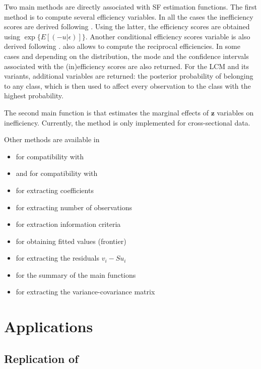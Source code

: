 \documentclass[nojss]{jss}
\begin{document}
Two main methods are directly associated with SF estimation functions. The first
method is  to compute several efficiency variables. In all 
the cases the inefficiency scores are derived following \cite{jon82}. Using
the latter, the efficiency scores are obtained using 
$\exp{\{E\left[\left(-u|\epsilon\right)\right]\}}$. Another conditional efficiency
scores variable is also derived following \cite{batt95}.  also allows
to compute the reciprocal efficiencies. In some cases and depending on the 
distribution, the mode and the confidence intervals associated with the 
(in)efficiency scores are also returned. For the LCM and its variants, additional 
variables are returned: the posterior probability of belonging to any class, 
which is then used to affect every observation to the class with the highest 
probability.

The second main function is  that estimates the marginal effects
of $\mathbf{z}$ variables on inefficiency. Currently, the 
method is only implemented for cross-sectional data.

Other methods are available in 
%
\begin{itemize}
\item {} for compatibility with 
\item {} and  for compatibility with 
\item {} for extracting coefficients
\item {} for extracting number of observations
\item {} for extraction information criteria
\item {} for obtaining fitted values (frontier)
\item {} for extracting the residuals $v_i -Su_i$
\item {} for the summary of the main functions
\item {} for extracting the variance-covariance matrix
\end{itemize}
%

\section{Applications} \label{sec:illus}

\subsection[Replication of Kumbhakar et al.2014, p. 119]{Replication of~\citet[p.~119]{kum14}}
\end{document}
